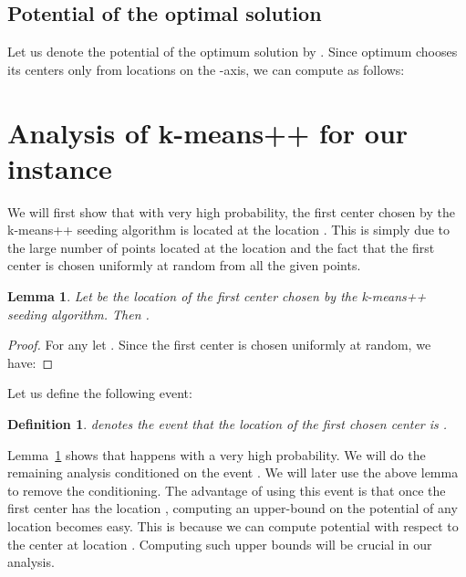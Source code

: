 \documentclass[11pt]{article}
\newtheorem{lemma}[theorem]{Lemma}
\newtheorem{definition}[theorem]{Definition}
\begin{document}
\subsection{Potential of the optimal solution}
Let us denote the potential of the optimum solution by . 
Since optimum chooses its centers only from locations on the -axis, we can compute  as follows:




















\section{Analysis of k-means++ for our instance}

We will first show that with very high probability, the first center chosen by the k-means++ seeding algorithm is located at the location .
This is simply due to the large number of points located at the location  and the fact that the first center is chosen uniformly at random from all the given points.

\begin{lemma}\label{lemma:event} 
Let  be the location of the first center chosen by the k-means++ seeding algorithm. Then .
\end{lemma}

\begin{proof}
For any  let . 
Since the first center is chosen uniformly at random, we have:
{
\allowdisplaybreaks

}
\end{proof}

Let us define the following event:
\begin{definition}\label{defn:event}
 denotes the event that the location of the first chosen center is .
\end{definition}

Lemma~\ref{lemma:event} shows that  happens with a very high probability.
We will do the remaining analysis conditioned on the event . 
We will later use the above lemma to remove the conditioning. 
The advantage of using this event is that once the first center has the location , computing an upper-bound on the potential of any location becomes easy.
This is because we can compute potential with respect to the center at location . 
Computing such upper bounds will be crucial in our analysis.
\end{document}
